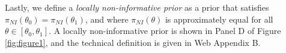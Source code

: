 \documentclass[useAMS,usenatbib,referee]{biom}
\begin{document}
Lastly, we define a \textit{locally non-informative prior} as a prior that satisfies $\pi_{NI}(\theta_0) = \pi_{NI}(\theta_1)$, and where $\pi_{NI}(\theta)$ is approximately equal for all $\theta \in \left[\theta_0,\theta_1\right]$.
A locally non-informative prior is shown in Panel D of Figure \ref{fig:figure1}, and the technical definition is given in Web Appendix B.
\end{document}

